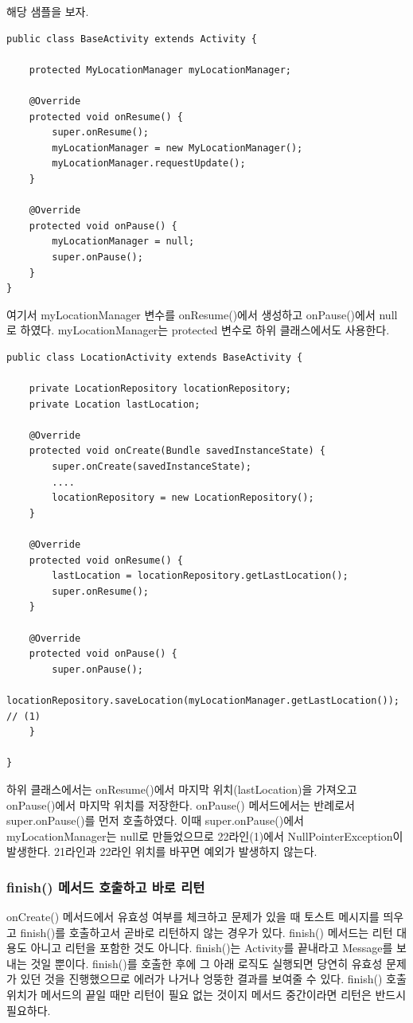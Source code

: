 해당 샘플을 보자.
\begin{lstlisting}[frame=single]
public class BaseActivity extends Activity {

	protected MyLocationManager myLocationManager;

	@Override
	protected void onResume() {
		super.onResume();
		myLocationManager = new MyLocationManager();
		myLocationManager.requestUpdate();
	}

	@Override
	protected void onPause() {
		myLocationManager = null;
		super.onPause();
	}
}
\end{lstlisting}
여기서 myLocationManager 변수를 onResume()에서 생성하고 onPause()에서 null로 하였다. myLocationManager는 protected 변수로 하위 클래스에서도 사용한다.

\begin{lstlisting}[frame=single]
public class LocationActivity extends BaseActivity {

	private LocationRepository locationRepository;
	private Location lastLocation;

	@Override
	protected void onCreate(Bundle savedInstanceState) {
		super.onCreate(savedInstanceState);
		....
		locationRepository = new LocationRepository();
	}

	@Override
	protected void onResume() {
		lastLocation = locationRepository.getLastLocation();
		super.onResume();
	}

	@Override
	protected void onPause() {
		super.onPause();
		locationRepository.saveLocation(myLocationManager.getLastLocation()); // (1)
	}

}
\end{lstlisting}
하위 클래스에서는 onResume()에서 마지막 위치(lastLocation)을 가져오고 onPause()에서 마지막 위치를 저장한다. onPause() 메서드에서는 반례로서 super.onPause()를 먼저 호출하였다. 이때 super.onPause()에서 myLocationManager는 null로 만들었으므로 22라인(1)에서 NullPointerException이 발생한다. 21라인과 22라인 위치를 바꾸면 예외가 발생하지 않는다. 

\subsubsection{finish() 메서드 호출하고 바로 리턴}
onCreate() 메서드에서 유효성 여부를 체크하고 문제가 있을 때 토스트 메시지를 띄우고 finish()를 호출하고서 곧바로 리턴하지 않는 경우가 있다. finish() 메서드는 리턴 대용도 아니고 리턴을 포함한 것도 아니다. finish()는 Activity를 끝내라고 Message를 보내는 것일 뿐이다. finish()를 호출한 후에 그 아래 로직도 실행되면 당연히 유효성 문제가 있던 것을 진행했으므로 에러가 나거나 엉뚱한 결과를 보여줄 수 있다. finish() 호출 위치가 메서드의 끝일 때만 리턴이 필요 없는 것이지 메서드 중간이라면 리턴은 반드시 필요하다.

